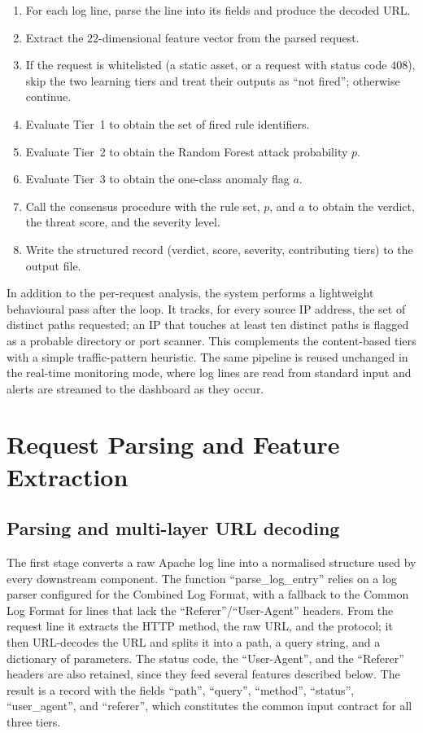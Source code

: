 \documentclass[12pt,a4paper]{report}
\begin{document}
\begin{enumerate}[leftmargin=1.8em, itemsep=2pt]
  \item For each log line, parse the line into its fields and produce the
        decoded URL.
  \item Extract the $22$-dimensional feature vector from the parsed request.
  \item If the request is whitelisted (a static asset, or a request with
        status code $408$), skip the two learning tiers and treat their
        outputs as ``not fired''; otherwise continue.
  \item Evaluate Tier~1 to obtain the set of fired rule identifiers.
  \item Evaluate Tier~2 to obtain the Random Forest attack probability $p$.
  \item Evaluate Tier~3 to obtain the one-class anomaly flag $a$.
  \item Call the consensus procedure with the rule set, $p$, and $a$ to
        obtain the verdict, the threat score, and the severity level.
  \item Write the structured record (verdict, score, severity, contributing
        tiers) to the output file.
\end{enumerate}

In addition to the per-request analysis, the system performs a lightweight
behavioural pass after the loop. It tracks, for every source IP address, the
set of distinct paths requested; an IP that touches at least ten distinct
paths is flagged as a probable directory or port scanner. This complements
the content-based tiers with a simple traffic-pattern heuristic. The same
pipeline is reused unchanged in the real-time monitoring mode, where log
lines are read from standard input and alerts are streamed to the dashboard
as they occur.

\section{Request Parsing and Feature Extraction}
\label{sec:pipeline-feat}

\subsection{Parsing and multi-layer URL decoding}

The first stage converts a raw Apache log line into a normalised structure
used by every downstream component. The function ``parse\_log\_entry''
relies on a log parser configured for the Combined Log Format, with a
fallback to the Common Log Format for lines that lack the
``Referer''/``User-Agent'' headers. From the request line it
extracts the HTTP method, the raw URL, and the protocol; it then URL-decodes
the URL and splits it into a path, a query string, and a dictionary of
parameters. The status code, the ``User-Agent'', and the
``Referer'' headers are also retained, since they feed several
features described below. The result is a record with the fields
``path'', ``query'', ``method'', ``status'',
``user\_agent'', and ``referer'', which constitutes the common
input contract for all three tiers.
\end{document}
